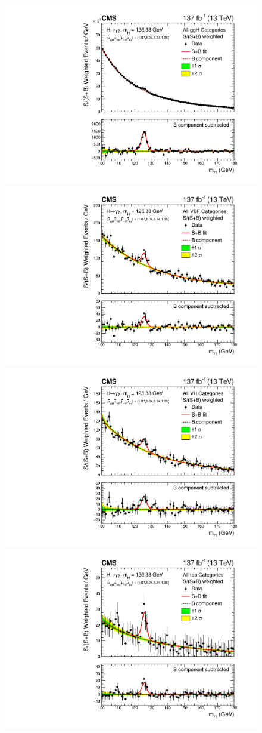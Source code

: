 \begin{figure}[htbp]
  \centering
  \includegraphics[width=.49\textwidth]{Figures/hgg_results/sPlusBweighted_ggH.pdf}
  \includegraphics[width=.49\textwidth]{Figures/hgg_results/sPlusBweighted_VBF.pdf}
  \includegraphics[width=.49\textwidth]{Figures/hgg_results/sPlusBweighted_VH.pdf}
  \includegraphics[width=.49\textwidth]{Figures/hgg_results/sPlusBweighted_top.pdf}
  \caption[Observed diphoton mass distribution for groups of categories targeting different Higgs boson production modes]
  {
}
\end{figure}
